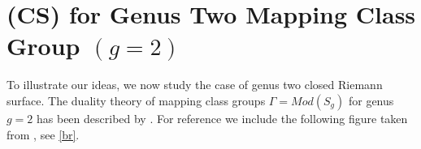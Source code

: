 \documentclass[12pt]{amsart}
\theoremstyle{definition}
\theoremstyle{remark}
\newcommand{\sC}{\mathscr{C}}
\newcommand{\sT}{\mathscr{T}}
\begin{document}
























\section{(CS) for Genus Two Mapping Class Group $(g=2)$}
To illustrate our ideas, we now study the case of genus two closed Riemann surface. The duality theory of mapping class groups $\Gamma=Mod(S_g)$ for genus $g=2$ has been described by \cite{Broaddus2012}. For reference we include the following figure taken from \cite[Fig.10]{Broaddus2012}, see \eqref{br}.%
\end{document}
